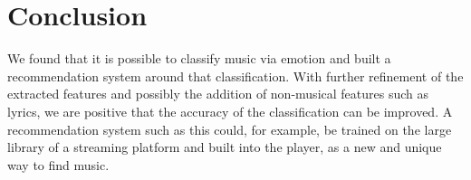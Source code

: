 \documentclass{sigchi-ext}
\begin{document}
\section{Conclusion}
We found that it is possible to classify music via emotion and built a recommendation system around that classification. With further refinement of the extracted features and possibly the addition of non-musical features such as lyrics, we are positive that the accuracy of the classification can be improved. A recommendation system such as this could, for example, be trained on the large library of a streaming platform and built into the player, as a new and unique way to find music.



\end{document}
